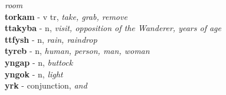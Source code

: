 \emph{room}\\ \vspace{7pt}\textbf{torkam}   - v tr, \emph{take, grab, remove}\\ \vspace{7pt}\textbf{ttakyba}   - n, \emph{visit, opposition of the Wanderer, years of age}\\ \vspace{7pt}\textbf{ttfysh}   - n, \emph{rain, raindrop}\\ \vspace{7pt}\textbf{tyreb}   - n, \emph{human, person, man, woman}\\ \vspace{7pt}\textbf{yngap}   - n, \emph{buttock}\\ \vspace{7pt}\textbf{yngok}   - n, \emph{light}\\ \vspace{7pt}\textbf{yrk}   - conjunction, \emph{and}\\ \vspace{7pt}